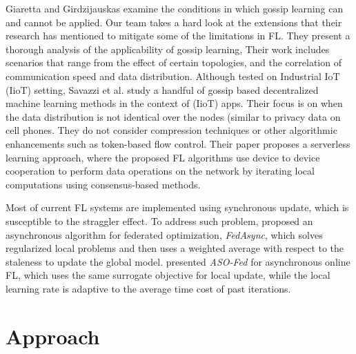 \documentclass[10pt,twocolumn,letterpaper]{article}
\theoremstyle{definition}
\begin{document}
Giaretta and Girdzijauskas \cite{giaretta2019gossip}  examine the conditions in which gossip learning can and cannot be applied.  Our team takes a hard look at the extensions that their research has mentioned to mitigate some of the limitations in FL.  They present a thorough analysis of the applicability of gossip learning, Their work includes scenarios that range from the effect of certain topologies, and the correlation of communication speed and data distribution. %
Although tested on Industrial IoT (IioT) setting, Savazzi et al. \cite{savazzi2020federated} study a handful of gossip based decentralized machine learning methods in the context of (IioT) apps. Their focus is on when the data distribution is not identical over the nodes (similar to privacy data on cell phones. They do not consider compression techniques or other algorithmic enhancements such as token-based flow control.
Their paper proposes a serverless learning approach, where the proposed FL algorithms use device to device cooperation to perform data operations on the  network by iterating local computations using consensus-based methods. %

Most of current FL systems are implemented using synchronous update, which is susceptible to the straggler effect. To address such problem, \cite{xie2019asynchronous} proposed an asynchronous algorithm for federated optimization, \textit{FedAsync}, which solves regularized local problems and then uses a weighted average with respect to the staleness to update the global model. \cite{chen2019asynchronous} presented \textit{ASO-Fed} for asynchronous online FL, which uses the same surrogate objective for local update, while the local learning rate is adaptive to the average time cost of past iterations. 

\section{Approach}

\end{document}
